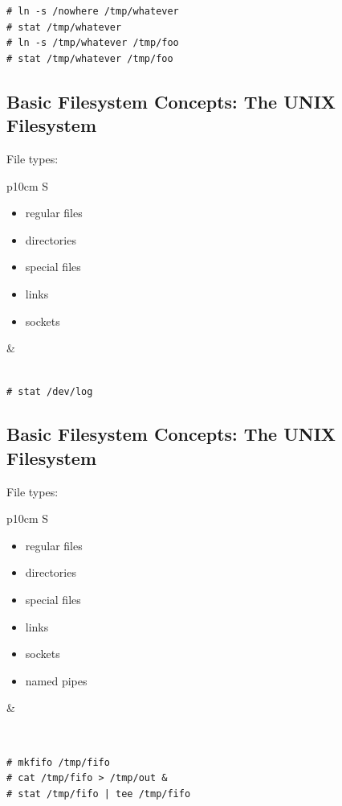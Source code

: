 \documentclass[xga]{xdvislides}
\begin{document}
\begin{verbatim}
# ln -s /nowhere /tmp/whatever
# stat /tmp/whatever
# ln -s /tmp/whatever /tmp/foo
# stat /tmp/whatever /tmp/foo
\end{verbatim}

\subsection{Basic Filesystem Concepts: The UNIX Filesystem}
File types:
\\

\begin{tabular}{ p{10cm} S }
\begin{itemize}
	\item regular files
	\item directories
	\item special files
	\item links
	\item sockets
\end{itemize}
&  \\
\end{tabular}
\\

\verb+# stat /dev/log+

\subsection{Basic Filesystem Concepts: The UNIX Filesystem}
File types:
\\

\begin{tabular}{ p{10cm} S }
\begin{itemize}
	\item regular files
	\item directories
	\item special files
	\item links
	\item sockets
	\item named pipes
\end{itemize}
&  \\
\end{tabular}
\\

\begin{verbatim}
# mkfifo /tmp/fifo
# cat /tmp/fifo > /tmp/out &
# stat /tmp/fifo | tee /tmp/fifo
\end{verbatim}
\end{document}
